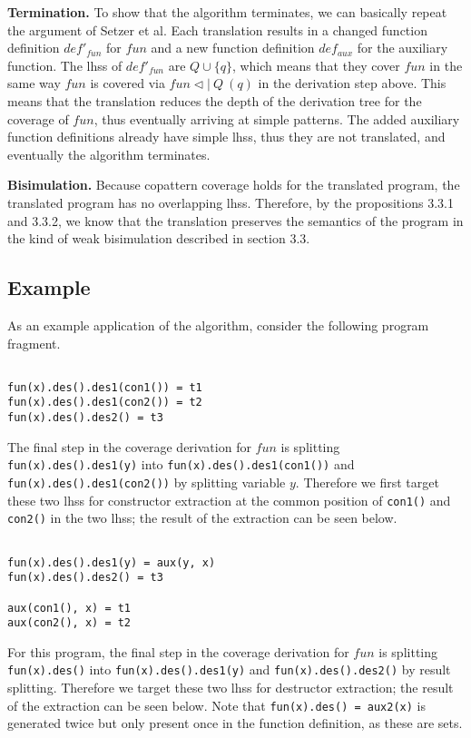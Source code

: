 \textbf{Termination.} To show that the algorithm terminates, we can basically repeat the argument of Setzer et al. Each translation results in a changed function definition $def'_{fun}$ for $fun$ and a new function definition $def_{aux}$ for the auxiliary function. The lhss of $def'_{fun}$ are $Q \cup \{q\}$, which means that they cover $fun$ in the same way $fun$ is covered via $fun \lhd | ~ Q ~ (q)$ in the derivation step above. This means that the translation reduces the depth of the derivation tree for the coverage of $fun$, thus eventually arriving at simple patterns. The added auxiliary function definitions already have simple lhss, thus they are not translated, and eventually the algorithm terminates.

\textbf{Bisimulation.} Because copattern coverage holds for the translated program, the translated program has no overlapping lhss. Therefore, by the propositions 3.3.1 and 3.3.2, we know that the translation preserves the semantics of the program in the kind of weak bisimulation described in section 3.3.

\subsection{Example}

As an example application of the algorithm, consider the following program fragment.

\begin{lstlisting}

fun(x).des().des1(con1()) = t1
fun(x).des().des1(con2()) = t2
fun(x).des().des2() = t3

\end{lstlisting}

The final step in the coverage derivation for $fun$ is splitting \texttt{fun(x).des().des1(y)} into \texttt{fun(x).des().des1(con1())} and \texttt{fun(x).des().des1(con2())} by splitting variable $y$. Therefore we first target these two lhss for constructor extraction at the common position of \texttt{con1()} and \texttt{con2()} in the two lhss; the result of the extraction can be seen below.

\begin{lstlisting}

fun(x).des().des1(y) = aux(y, x)
fun(x).des().des2() = t3

aux(con1(), x) = t1
aux(con2(), x) = t2

\end{lstlisting}

For this program, the final step in the coverage derivation for $fun$ is splitting \texttt{fun(x).des()} into \texttt{fun(x).des().des1(y)} and \texttt{fun(x).des().des2()} by result splitting. Therefore we target these two lhss for destructor extraction; the result of the extraction can be seen below. Note that \texttt{fun(x).des() = aux2(x)} is generated twice but only present once in the function definition, as these are sets.

